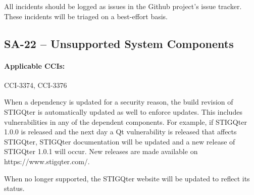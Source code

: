 \documentclass[letterpaper, 10pt, twoside]{article}
\begin{document}
All incidents should be logged as issues in the Github project's issue tracker. These incidents will be triaged on a best-effort basis.

\subsection{SA-22 -- Unsupported System Components}

\paragraph{Applicable CCIs:} CCI-3374, CCI-3376

When a dependency is updated for a security reason, the build revision of STIGQter is automatically updated as well to enforce updates. This includes vulnerabilities in any of the dependent components. For example, if STIGQter 1.0.0 is released and the next day a Qt vulnerability is released that affects STIGQter, STIGQter documentation will be updated and a new release of STIGQter 1.0.1 will occur. New releases are made available on https://www.stigqter.com/.

When no longer supported, the STIGQter website will be updated to reflect its status.

\clearpage
\printbibliography
\end{document}
